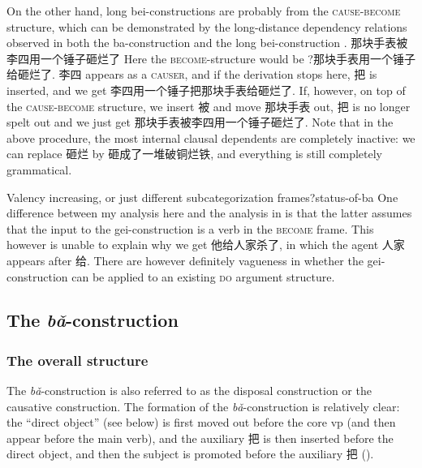 \documentclass[UTF8, a4paper, oneside, scheme=plain, 12pt]{ctexrep}
\newcommand*{\citesec}[1]{\S~{#1}}
\newcommand*{\citepage}[1]{p.~{#1}}
\newcommand{\form}[1]{\emph{#1}}
\newcommand*{\category}[1]{\textsc{#1}}
\begin{document}
On the other hand, long bei-constructions are probably 
from the \category{cause}-\category{become} structure,
which can be demonstrated by the long-distance dependency relations 
observed in both the ba-construction  
and the long bei-construction
\citep[\citesec{4.2.1.5}]{huang2013}.
那块手表被李四用一个锤子砸烂了 
Here the \category{become}-structure would be 
?那块手表用一个锤子给砸烂了. 
李四 appears as a \category{causer},
and if the derivation stops here, 
把 is inserted, and we get 李四用一个锤子把那块手表给砸烂了.
If, however, on top of the \category{cause}-\category{become} structure, 
we insert 被 and move 那块手表 out, 
把 is no longer spelt out 
and we just get 那块手表被李四用一个锤子砸烂了.
Note that in the above procedure, 
the most internal clausal dependents are completely inactive: 
we can replace 砸烂 by 砸成了一堆破铜烂铁, 
and everything is still completely grammatical.

\begin{infobox}{Valency increasing, or just different subcategorization frames?}{status-of-ba}
    One difference between my analysis here and the analysis in \citet[\citepage{202}]{deng2010formal}
    is that the latter assumes that the input to the gei-construction 
    is a verb in the \category{become} frame.
    This however is unable to explain why we get 他给人家杀了,
    in which the agent 人家 appears after 给.
    There are however definitely vagueness in whether 
    the gei-construction can be applied to an existing \category{do} argument structure.
\end{infobox}


\subsection{The \form{bǎ}-construction}\label{sec:verb-phrase.object.ba}

\subsubsection{The overall structure}

The \form{bǎ}-construction is also referred to as 
the disposal construction or the causative construction.
The formation of the \form{bǎ}-construction is relatively clear: 
the ``direct object'' (see below) is first moved out
before the core \acs{vp} 
(and then appear before the main verb),
and the auxiliary 把 is then inserted before the direct object,
and then the subject is promoted before the auxiliary 把 ().
\end{document}
